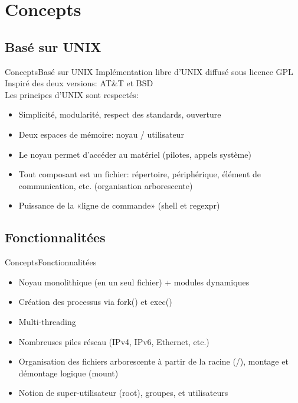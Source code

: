 \section{Concepts}

\subsection{Basé sur UNIX}
\begin{frame}{Concepts}{Basé sur UNIX}
	Implémentation libre d'UNIX diffusé sous licence GPL\\
	Inspiré des deux versions: AT\&T et BSD\\
	Les principes d'UNIX sont respectés:
	\begin{itemize}
		\item
			Simplicité, modularité, respect des standards, ouverture
		\item
			Deux espaces de mémoire: noyau / utilisateur
		\item
			Le noyau permet d'accéder au matériel (pilotes, appels système)
		\item
			Tout composant est un fichier: répertoire, périphérique, élément de communication, etc. (organisation arborescente)
		\item
			Puissance de la «ligne de commande» (shell et regexpr)			
	\end{itemize}	
\end{frame}

\subsection{Fonctionnalitées}
\begin{frame}{Concepts}{Fonctionnalitées}
	\begin{itemize}
		\item
			Noyau monolithique (en un seul fichier) + modules dynamiques
		\item
			Création des processus via fork() et exec()
		\item
			Multi-threading
		\item
			Nombreuses piles réseau (IPv4, IPv6, Ethernet, etc.)
		\item
			Organisation des fichiers arborescente à partir de la racine (/), montage et démontage logique (mount)
		\item
			Notion de super-utilisateur (root), groupes, et utilisateurs
	\end{itemize}
\end{frame}